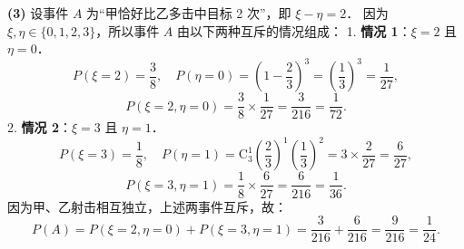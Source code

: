\begin{answer}
\textbf{(3)}
设事件 $A$ 为“甲恰好比乙多击中目标 2 次”，即 $\xi - \eta = 2$．
因为 $\xi, \eta \in \{0, 1, 2, 3\}$，所以事件 $A$ 由以下两种互斥的情况组成：
1. \textbf{情况 1}：$\xi = 2$ 且 $\eta = 0$．
\nopagebreak[4]
\[P(\xi = 2) = \frac{3}{8}, \quad P(\eta = 0) = \left(1 - \frac{2}{3}\right)^3 = \left(\frac{1}{3}\right)^3 = \frac{1}{27},\]
\nopagebreak[4]
\[P(\xi = 2, \eta = 0) = \frac{3}{8} \times \frac{1}{27} = \frac{3}{216} = \frac{1}{72}.\]
2. \textbf{情况 2}：$\xi = 3$ 且 $\eta = 1$．
\nopagebreak[4]
\[P(\xi = 3) = \frac{1}{8}, \quad P(\eta = 1) = \mathrm{C}_3^1 \left(\frac{2}{3}\right)^1 \left(\frac{1}{3}\right)^2 = 3 \times \frac{2}{27} = \frac{6}{27},\]
\nopagebreak[4]
\[P(\xi = 3, \eta = 1) = \frac{1}{8} \times \frac{6}{27} = \frac{6}{216} = \frac{1}{36}.\]
因为甲、乙射击相互独立，上述两事件互斥，故：
\nopagebreak[4]
\[
P(A) = P(\xi = 2, \eta = 0) + P(\xi = 3, \eta = 1) = \frac{3}{216} + \frac{6}{216} = \frac{9}{216} = \frac{1}{24}.
\]




\end{answer}
